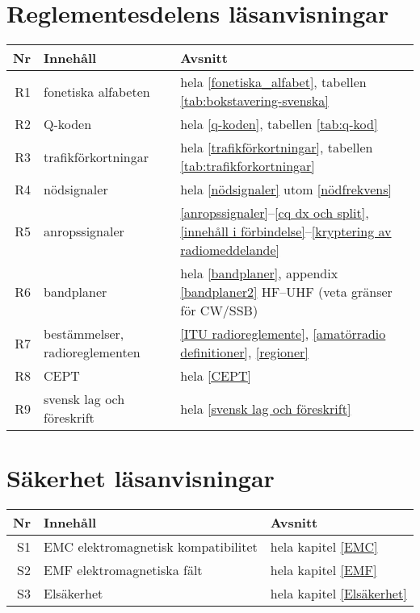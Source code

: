 \newpage

\section{Reglementesdelens läsanvisningar}

\begin{table}[H]
\small
\begin{tabular}{rll}
\textbf{Nr} & \textbf{Innehåll} & \textbf{Avsnitt}\\ \hline\hline
R1 & fonetiska alfabeten & 
hela \ref{fonetiska_alfabet}, tabellen \ref{tab:bokstavering-svenska}\\ \hline
R2 & Q-koden &
hela \ref{q-koden}, tabellen \ref{tab:q-kod}\\ \hline
R3 & trafikförkortningar & 
hela \ref{trafikförkortningar}, tabellen \ref{tab:trafikforkortningar}\\ \hline
R4 & nödsignaler & 
hela \ref{nödsignaler} utom \ref{nödfrekvens}\\ \hline
R5 & anropssignaler & 
\ref{anropssignaler}--\ref{cq dx och split}, \ref{innehåll i förbindelse}--\ref{kryptering av radiomeddelande} \\ \hline
R6 & bandplaner &
hela \ref{bandplaner}, appendix \ref{bandplaner2} HF--UHF (veta gränser för CW/SSB)\\ \hline
R7 & bestämmelser, radioreglementen & 
\ref{ITU radioreglemente}, \ref{amatörradio definitioner}, \ref{regioner}\\ \hline
R8 & CEPT &
hela \ref{CEPT} \\ \hline
R9 & svensk lag och föreskrift & 
hela \ref{svensk lag och föreskrift} \\ \hline
\end{tabular}
\normalsize
\end{table}

\section{Säkerhet läsanvisningar}

\begin{table}[H]
	\small
	\begin{tabular}{rll}
		\textbf{Nr} & \textbf{Innehåll} & \textbf{Avsnitt}\\ \hline\hline
		S1 & EMC elektromagnetisk kompatibilitet & 
		hela kapitel  \ref{EMC}\\ \hline
		S2 & EMF elektromagnetiska fält &
		hela kapitel  \ref{EMF}\\ \hline
		S3 & Elsäkerhet & 
		hela kapitel  \ref{Elsäkerhet}\\ \hline
	\end{tabular}
	\normalsize
\end{table}

\twocolumn
